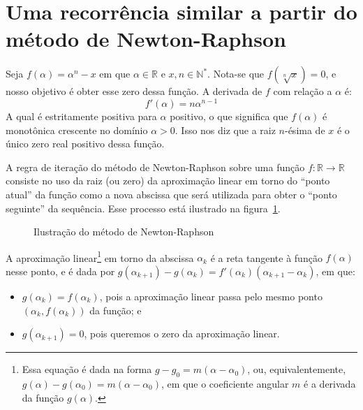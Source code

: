 \documentclass{article}
\author{Danilo J. S. Bellini}
\begin{document}
\maketitle






\section*{Uma recorrência similar a partir do método de Newton-Raphson}

Seja $f(\alpha) = \alpha^n - x$
em que $\alpha \in \mathds{R}$ e $x, n \in \mathds{N}^*$.
Nota-se que $f(\sqrt[n]{x}) = 0$,
e nosso objetivo é obter esse zero dessa função.
A derivada de $f$ com relação a $\alpha$ é:
\[f'(\alpha) = n \alpha^{n-1}\]
A qual é estritamente positiva para $\alpha$ positivo,
o que significa que $f(\alpha)$ é monotônica crescente
no domínio $\alpha > 0$.
Isso nos diz que a raiz $n$-ésima de $x$
é o único zero real positivo dessa função.

A regra de iteração do método de Newton-Raphson
sobre uma função $f:\mathds{R}\to\mathds{R}$
consiste no uso da raiz (ou zero)
da aproximação linear em torno do ``ponto atual'' da função
como a nova abscissa que será utilizada
para obter o ``ponto seguinte'' da sequência.
Esse processo está ilustrado na figura~\ref{fig:newton-raphson}.

\begin{figure}[H]
  \centering
  
  \caption{Ilustração do método de Newton-Raphson}
  \label{fig:newton-raphson}
\end{figure}

A aproximação linear\footnote{
  Essa equação é dada na forma $g - g_0 = m (\alpha - \alpha_0)$,
  ou, equivalentemente,
  $g(\alpha) - g(\alpha_0) = m (\alpha - \alpha_0)$,
  em que o coeficiente angular $m$ é a derivada da função $g(\alpha)$.
} em torno da abscissa $\alpha_k$
é a reta tangente à função $f(\alpha)$ nesse ponto,
e é dada por
$g(\alpha_{k+1}) - g(\alpha_k) =
 f'(\alpha_k) \left( \alpha_{k+1} - \alpha_k \right)$,
em que:
\begin{itemize}
  \item
  $g(\alpha_k) = f(\alpha_k)$, pois a aproximação linear
  passa pelo mesmo ponto $(\alpha_k, f(\alpha_k))$ da função; e
  \item
  $g(\alpha_{k+1}) = 0$,
  pois queremos o zero da aproximação linear.
\end{itemize}
\end{document}
